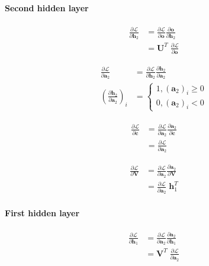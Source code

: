 \documentclass{article}
\numberwithin{equation}{section}
\begin{document}
\paragraph{Second hidden layer}
\begin{equation}
\begin{split}
	\frac{\partial\mathcal{L}}{\partial\bm{h}_2}
		&= \frac{\partial\mathcal{L}}{\partial\bm{o}} \frac{\partial\bm{o}}{\partial\bm{h}_2} \\
		&= \bm{U}^T\; \frac{\partial\mathcal{L}}{\partial\bm{o}}
\end{split}
\end{equation}

\begin{equation}
\begin{split}
	\frac{\partial\mathcal{L}}{\partial\bm{a}_2}
		&= \frac{\partial\mathcal{L}}{\partial\bm{h}_2} \frac{\partial\bm{h}_2}{\partial\bm{a}_2} \\
	\left(\frac{\partial\bm{h}_2}{\partial\bm{a}_2}\right)_i 
		&= \left\{\begin{matrix}
			1, (\bm{a}_2)_i \geq 0 \\ 
			0, (\bm{a}_2)_i < 0
			\end{matrix}\right.
\end{split}
\end{equation}

\begin{equation}
\begin{split}
	\frac{\partial\mathcal{L}}{\partial\bm{c}}
		&= \frac{\partial\mathcal{L}}{\partial\bm{a}_2} \frac{\partial\bm{a}_2}{\partial\bm{c}} \\
		&= \frac{\partial\mathcal{L}}{\partial\bm{a}_2}
\end{split}
\end{equation}

\begin{equation}
\begin{split}
	\frac{\partial\mathcal{L}}{\partial\bm{V}}
		&= \frac{\partial\mathcal{L}}{\partial\bm{a}_2} \frac{\partial\bm{a}_2}{\partial\bm{V}} \\
		&= \frac{\partial\mathcal{L}}{\partial\bm{a}_2} \;\bm{h}_1^T
\end{split}
\end{equation}

\paragraph{First hidden layer}
\begin{equation}
\begin{split}
	\frac{\partial\mathcal{L}}{\partial\bm{h}_1}
		&= \frac{\partial\mathcal{L}}{\partial\bm{a}_2} \frac{\partial\bm{a}_2}{\partial\bm{h}_1} \\
		&= \bm{V}^T\; \frac{\partial\mathcal{L}}{\partial\bm{a}_2}
\end{split}
\end{equation}
\end{document}
